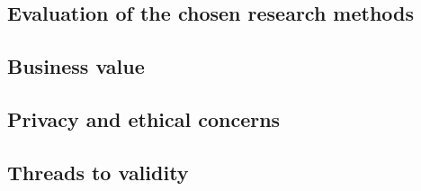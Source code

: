 
\subsection{Evaluation of the chosen research methods}

\subsection{Business value}

\subsection{Privacy and ethical concerns}

\subsection{Threads to validity}